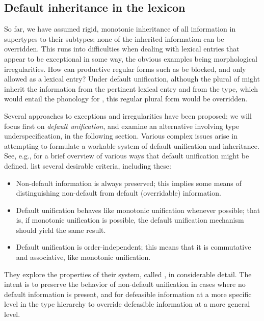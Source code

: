 \documentclass[output=paper
 	        ,biblatex
                ,babelshorthands
                ,newtxmath
                ,draftmode
                ,colorlinks, citecolor=brown
]{langscibook}
\begin{document}
\subsection{Default inheritance in the lexicon}

%
%
So far, we have assumed rigid, monotonic inheritance of all information in supertypes to their subtypes; none of the inherited information can be overridden.
This runs into difficulties when dealing with lexical entries that appear to be exceptional in some way, the obvious examples being morphological irregularities.
How can productive regular forms such as  be blocked, and only  allowed as a lexical entry?
Under default unification, although the plural of  might inherit the information from the pertinent lexical entry and from the  type, which would entail the phonology for , this regular plural form would be overridden.

Several approaches to exceptions and irregularities have been proposed; we will focus first on \emph{default unification}, and examine an alternative involving type underspecification, in the following section. Various complex issues arise in attempting to formulate a workable system of default unification and inheritance.
See, e.g., \citet{BriscoeandCopestake1999} for a brief overview of various ways that default unification might be defined.
\citet{LascaridesandCopestake1999} list several desirable criteria, including these:

\begin{itemize}
	\item Non-default information is always preserved; this implies some means of  distinguishing non-default from default (overridable) information.
	\item Default unification behaves like monotonic unification whenever possible; that is, if monotonic unification is possible, the default unification mechanism should yield the same result.
	\item Default unification is order-independent; this means that it is commutative and associative, like monotonic unification.
\end{itemize}

They explore the properties of their system, called , in considerable detail.
The intent is to preserve the behavior of non-default unification in cases where no default information is present, and for defeasible information at a more specific level in the type hierarchy to override defeasible information at a more general level.
\end{document}
